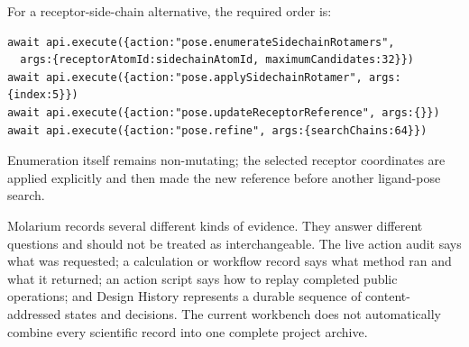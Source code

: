 \documentclass[11pt]{article}
\begin{document}
For a receptor-side-chain alternative, the required order is:

\begin{lstlisting}
await api.execute({action:"pose.enumerateSidechainRotamers",
  args:{receptorAtomId:sidechainAtomId, maximumCandidates:32}})
await api.execute({action:"pose.applySidechainRotamer", args:{index:5}})
await api.execute({action:"pose.updateReceptorReference", args:{}})
await api.execute({action:"pose.refine", args:{searchChains:64}})
\end{lstlisting}

Enumeration itself remains non-mutating; the selected receptor coordinates are applied explicitly and then made the new reference before another ligand-pose search.


Molarium records several different kinds of evidence. They answer different questions and should not be treated as interchangeable. The live action audit says what was requested; a calculation or workflow record says what method ran and what it returned; an action script says how to replay completed public operations; and Design History represents a durable sequence of content-addressed states and decisions. The current workbench does not automatically combine every scientific record into one complete project archive.
\end{document}
